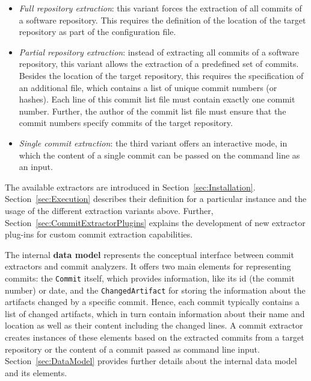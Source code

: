 \begin{itemize}
\item \textit{Full repository extraction}: this variant forces the extraction of all commits of a software repository. This requires the definition of the location of the target repository as part of the configuration file.
\item \textit{Partial repository extraction}: instead of extracting all commits of a software repository, this variant allows the extraction of a predefined set of commits. Besides the location of the target repository, this requires the specification of an additional file, which contains a list of unique commit numbers (or hashes). Each line of this commit list file must contain exactly one commit number. Further, the author of the commit list file must ensure that the commit numbers specify commits of the target repository.
\item \textit{Single commit extraction}: the third variant offers an interactive mode, in which the content of a single commit can be passed on the command line as an input.
\end{itemize}

The available extractors are introduced in Section~\ref{sec:Installation}. Section~\ref{sec:Execution} describes their definition for a particular \thetool{} instance and the usage of the different extraction variants above. Further, Section~\ref{sec:CommitExtractorPlugins} explains the development of new extractor plug-ins for custom commit extraction capabilities.

The internal \textbf{data model} represents the conceptual interface between commit extractors and commit analyzers. It offers two main elements for representing commits: the \texttt{Commit} itself, which provides information, like its id (the commit number) or date, and the \texttt{ChangedArtifact} for storing the information about the artifacts changed by a specific commit. Hence, each commit typically contains a list of changed artifacts, which in turn contain information about their name and location as well as their content including the changed lines. A commit extractor creates instances of these elements based on the extracted commits from a target repository or the content of a commit passed as command line input. Section~\ref{sec:DataModel} provides further details about the internal data model and its elements.

